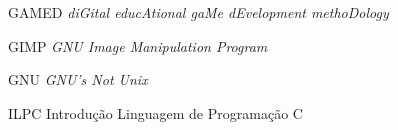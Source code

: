 \begin{siglas}
  \item[GAMED] \emph{diGital educAtional gaMe dEvelopment methoDology}
  \item[GIMP] \emph{GNU Image Manipulation Program}
  \item[GNU] \emph{GNU's Not Unix}
  \item[ILPC] Introdução Linguagem de Programação C
\end{siglas}
